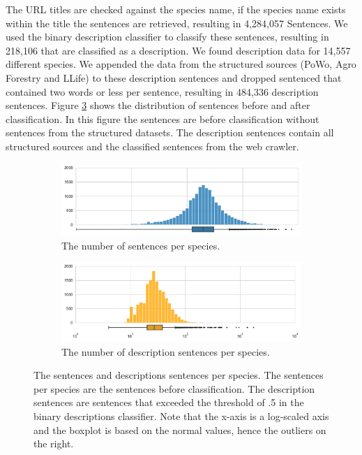 \documentclass[a4paper, 12pt, oneside]{book} %
\begin{document}
The URL titles are checked against the species name, if the species name exists within the title the sentences are retrieved, resulting in 4,284,057 Sentences.
We used the binary description classifier to classify these sentences, resulting in 218,106 that are classified as a description.
We found description data for 14,557 different species.
We appended the data from the structured sources (PoWo, Agro Forestry and LLife) to these description sentences and dropped sentenced that contained two words or less per sentence, resulting in 484,336 description sentences.
Figure \ref{fig:text_distribution} shows the distribution of sentences before and after classification.
In this figure the sentences are before classification without sentences from the structured datasets.
The description sentences contain all structured sources and the classified sentences from the web crawler.
\begin{figure} [h!]
     \centering
     \begin{subfigure}[b]{1\textwidth}
         \centering
         \includegraphics[width=\textwidth]{figures/text_distribution_1.pdf}
         \caption{The number of sentences per species.}
         \label{fig:text_distribution_1}
     \end{subfigure}
     \vfill
     \begin{subfigure}[b]{1\textwidth}
         \centering
         \includegraphics[width=\textwidth]{figures/text_distribution_2.pdf}
         \caption{The number of description sentences per species.}
         \label{fig:text_distribution_2}
     \end{subfigure}
     \caption[The sentences and descriptions sentences per species]{The sentences and descriptions sentences per species. The sentences per species are the sentences before classification. The description sentences are sentences that exceeded the threshold of .5 in the binary descriptions classifier. Note that the x-axis is a log-scaled axis and the boxplot is based on the normal values, hence the outliers on the right.}
     \label{fig:text_distribution}
\end{figure}
\end{document}
